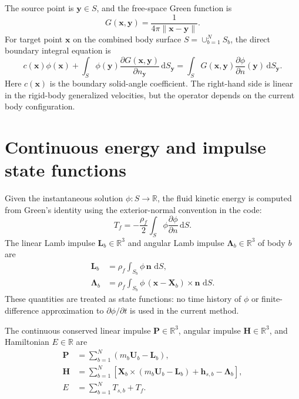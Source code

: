 \documentclass[11pt,a4paper]{article}
\newcommand{\R}{\mathbb{R}}
\newcommand{\dd}{\,\mathrm{d}}
\newcommand{\bn}{\bm{n}}
\newcommand{\bx}{\bm{x}}
\newcommand{\by}{\bm{y}}
\newcommand{\bX}{\bm{X}}
\newcommand{\bU}{\bm{U}}
\newcommand{\bL}{\bm{L}}
\newcommand{\bLam}{\bm{\Lambda}}
\newcommand{\bh}{\bm{h}}
\newcommand{\bP}{\bm{P}}
\newcommand{\bH}{\bm{H}}
\begin{document}
The source point is $\by\in S$, and the free-space Green function is
\begin{equation}
  G(\bx,\by)=\frac{1}{4\pi\|\bx-\by\|}.
  \label{eq:green}
\end{equation}
For target point $\bx$ on the combined body surface $S=\cup_{b=1}^N S_b$, the
direct boundary integral equation is
\begin{equation}
  c(\bx)\phi(\bx)
  +
  \int_S
  \phi(\by)\frac{\partial G(\bx,\by)}{\partial n_{\by}}\dd S_{\by}
  =
  \int_S
  G(\bx,\by)\frac{\partial\phi}{\partial n}(\by)\dd S_{\by}.
  \label{eq:continuous-bie}
\end{equation}
Here $c(\bx)$ is the boundary solid-angle coefficient.  The right-hand side is
linear in the rigid-body generalized velocities, but the operator depends on
the current body configuration.

\section{Continuous energy and impulse state functions}

Given the instantaneous solution $\phi:S\to\R$, the fluid kinetic energy is computed
from Green's identity using the exterior-normal convention in the code:
\begin{equation}
  T_f
  =
  -\frac{\rho_f}{2}
  \int_S
  \phi\frac{\partial\phi}{\partial n}\dd S .
  \label{eq:continuous-fluid-ke}
\end{equation}
The linear Lamb impulse $\bL_b\in\R^3$ and angular Lamb impulse
$\bLam_b\in\R^3$ of body $b$ are
\begin{align}
  \bL_b
  &=
  \rho_f\int_{S_b}\phi\,\bn\,\dd S,
  \label{eq:continuous-lin-lamb}\\
  \bLam_b
  &=
  \rho_f\int_{S_b}
  \phi\,(\bx-\bX_b)\times\bn\,\dd S .
  \label{eq:continuous-ang-lamb}
\end{align}
These quantities are treated as state functions: no time history of $\phi$ or
finite-difference approximation to $\partial\phi/\partial t$ is used in the
current method.

The continuous conserved linear impulse $\bP\in\R^3$, angular impulse
$\bH\in\R^3$, and Hamiltonian $E\in\R$ are
\begin{align}
  \bP
  &=
  \sum_{b=1}^N
  \left(m_b\bU_b-\bL_b\right),
  \label{eq:continuous-p}\\
  \bH
  &=
  \sum_{b=1}^N
  \left[
    \bX_b\times\left(m_b\bU_b-\bL_b\right)
    +\bh_{s,b}
    -\bLam_b
  \right],
  \label{eq:continuous-h}\\
  E
  &=
  \sum_{b=1}^N T_{s,b}+T_f .
  \label{eq:continuous-energy}
\end{align}
\end{document}
